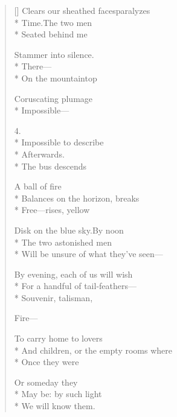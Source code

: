 \begin{verse}[\versewidth]
Clears our sheathed faces\qquad paralyzes\\*
Time.\qquad The two men\\*
Seated behind me

Stammer into silence.\\*
\hspace{3\vgap} There---\\*
On the mountaintop

Coruscating plumage\\*
Impossible---

4.\\*
Impossible to describe\\*
Afterwards.\\*
\hspace{3\vgap}The bus descends

A ball of fire\\*
Balances on the horizon, breaks\\*
Free---rises, yellow

Disk on the blue sky.\qquad By noon\\*
The two astonished men\\*
Will be unsure of what they've seen---

By evening, each of us will wish\\*
For a handful of tail-feathers---\\*
Souvenir, talisman,

Fire---

To carry home to lovers\\*
And children, or the empty rooms where\\*
Once they were

Or someday they\\*
May be: by such light\\*
We will know them.
\end{verse}
